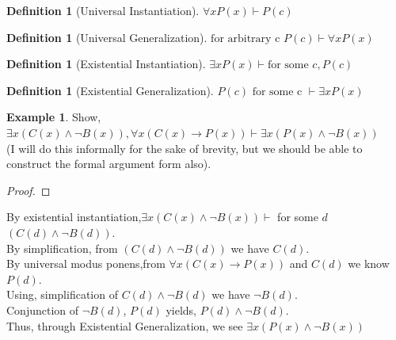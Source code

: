 \documentclass[letterpaper,10pt]{article}
\theoremstyle{plain}
\theoremstyle{definition}
\newtheorem{defn}[thm]{Definition}
\newtheorem{exmp}[thm]{Example}
\theoremstyle{remark}
\providecommand{\land}{\ensuremath{\wedge}}
\begin{document}
\vspace{4cm}
\newpage 
\begin{defn}[Universal Instantiation]
$\forall x P(x) \vdash P(c)$
\end{defn}
\begin{defn}[Universal Generalization]
$\text{for arbitrary c } P(c)  \vdash \forall x P(x) $
\end{defn}
\begin{defn}[Existential Instantiation]
$\exists x P(x) \vdash \text{for some } c, P(c)$
\end{defn}
\begin{defn}[Existential Generalization]
$ P(c) \text{ for some c } \vdash \exists x P(x)$
\end{defn}
\begin{exmp}
Show,
$\exists x(C(x)\land \lnot B(x)), \forall x(C(x) \to P(x)) \vdash \exists x(P(x)\land \lnot B(x))$
\\
(I will do this informally for the sake of brevity, but we should be able to construct the formal argument form also).
\begin{proof}

\end{proof}
By existential instantiation,$\exists x(C(x)\land \lnot B(x))\vdash$ for some $d$ $(C(d)\land \lnot B(d))$. \\
By simplification, from $(C(d)\land \lnot B(d))$ we have $ C(d)$.\\
By universal modus ponens,from 
$\forall x(C(x) \to P(x))$ and $C(d)$ we know $P(d)$.\\
Using, simplification of $C(d)\land \lnot B(d)$ we have  $\lnot B(d)$. 
\\
Conjunction of $\lnot B(d)$, $P(d)$ yields, $P(d) \land \lnot B(d)$.
\\ Thus, through Existential Generalization, we see $\exists x(P(x)\land \lnot B(x))$





\end{exmp}
\end{document}
